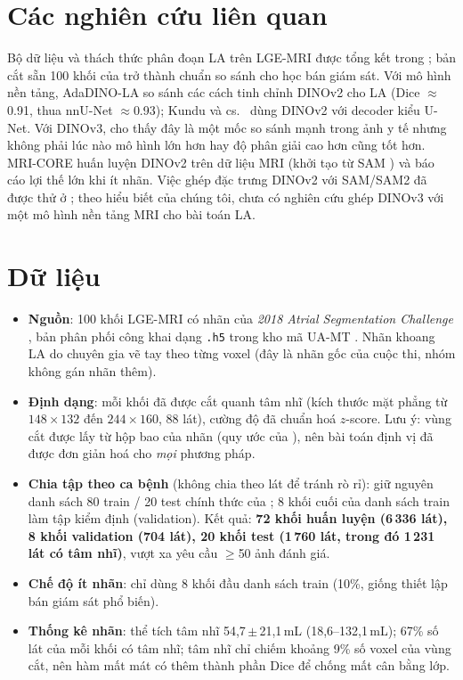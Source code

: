 \documentclass[11pt,a4paper]{article}
\begin{document}
\section{Các nghiên cứu liên quan}
Bộ dữ liệu và thách thức phân đoạn LA trên LGE-MRI được tổng kết trong \cite{xiong2021}; bản cắt sẵn 100 khối của \cite{uamt} trở thành chuẩn so sánh cho học bán giám sát. Với mô hình nền tảng, AdaDINO-LA \cite{adadino} so sánh các cách tinh chỉnh DINOv2 \cite{dinov2} cho LA (Dice $\approx$0.91, thua nnU-Net $\approx$0.93); Kundu và cs.\ \cite{kundu2025} dùng DINOv2 với decoder kiểu U-Net. Với DINOv3, \cite{liu2025dinov3med} cho thấy đây là một mốc so sánh mạnh trong ảnh y tế nhưng không phải lúc nào mô hình lớn hơn hay độ phân giải cao hơn cũng tốt hơn. MRI-CORE \cite{mricore} huấn luyện DINOv2 trên dữ liệu MRI (khởi tạo từ SAM \cite{sam}) và báo cáo lợi thế lớn khi ít nhãn. Việc ghép đặc trưng DINOv2 với SAM/SAM2 đã được thử ở \cite{dsunet}; theo hiểu biết của chúng tôi, chưa có nghiên cứu ghép DINOv3 với một mô hình nền tảng MRI cho bài toán LA.

\section{Dữ liệu}
\begin{itemize}
\item \textbf{Nguồn}: 100 khối LGE-MRI có nhãn của \emph{2018 Atrial Segmentation Challenge} \cite{xiong2021}, bản phân phối công khai dạng \texttt{.h5} trong kho mã UA-MT \cite{uamt}. Nhãn khoang LA do chuyên gia vẽ tay theo từng voxel (đây là nhãn gốc của cuộc thi, nhóm không gán nhãn thêm).
\item \textbf{Định dạng}: mỗi khối đã được cắt quanh tâm nhĩ (kích thước mặt phẳng từ $148\times132$ đến $244\times160$, 88 lát), cường độ đã chuẩn hoá $z$-score. Lưu ý: vùng cắt được lấy từ hộp bao của nhãn (quy ước của \cite{uamt}), nên bài toán định vị đã được đơn giản hoá cho \emph{mọi} phương pháp.
\item \textbf{Chia tập theo ca bệnh} (không chia theo lát để tránh rò rỉ): giữ nguyên danh sách 80 train / 20 test chính thức của \cite{uamt}; 8 khối cuối của danh sách train làm tập kiểm định (validation). Kết quả: \textbf{72 khối huấn luyện (6\,336 lát), 8 khối validation (704 lát), 20 khối test (1\,760 lát, trong đó 1\,231 lát có tâm nhĩ)}, vượt xa yêu cầu $\ge$50 ảnh đánh giá.
\item \textbf{Chế độ ít nhãn}: chỉ dùng 8 khối đầu danh sách train (10\%, giống thiết lập bán giám sát phổ biến).
\item \textbf{Thống kê nhãn}: thể tích tâm nhĩ 54,7\,$\pm$\,21,1\,mL (18,6--132,1\,mL); 67\% số lát của mỗi khối có tâm nhĩ; tâm nhĩ chỉ chiếm khoảng 9\% số voxel của vùng cắt, nên hàm mất mát có thêm thành phần Dice để chống mất cân bằng lớp.
\end{itemize}
\end{document}
